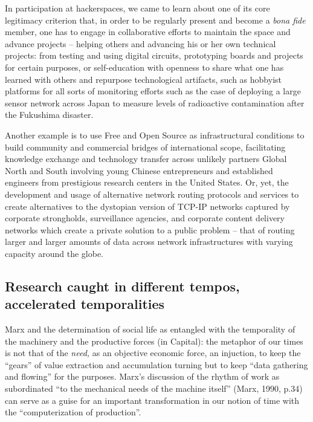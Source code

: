 \documentclass[10pt,letter,oneside]{scrartcl}
\begin{document}
  In participation at hackerspaces, we came to learn about one of its
  core legitimacy criterion that, in order to be regularly present and
  become a \emph{bona fide} member, one has to engage in collaborative
  efforts to maintain the space and advance projects -- helping others
  and advancing his or her own technical projects: from testing and
  using digital circuits, prototyping boards and projects for certain
  purposes, or self-education with openness to share what one has
  learned with others and repurpose technological artifacts, such as
  hobbyist platforms for all sorts of monitoring efforts such as the
  case of deploying a large sensor network across Japan to measure
  levels of radioactive contamination after the Fukushima
  disaster.

  Another example is to use Free and Open Source as infrastructural
  conditions to build community and commercial bridges of
  international scope, facilitating knowledge exchange and technology
  transfer across unlikely partners Global North and South involving
  young Chinese entrepreneurs and established engineers from
  prestigious research centers in the United States. Or, yet, the
  development and usage of alternative network routing protocols and
  services to create alternatives to the dystopian version of TCP-IP
  networks captured by corporate strongholds, surveillance agencies,
  and corporate content delivery networks which create a private
  solution to a public problem -- that of routing larger and larger
  amounts of data across network infrastructures with varying capacity
  around the globe.

\subsection{Research caught in different tempos, accelerated
    temporalities} 

  Marx and the determination of social life as entangled with the
  temporality of the machinery and the productive forces (in Capital):
  the metaphor of our times is not that of the \emph{need,} as an
  objective economic force, an injuction, to keep the ``gears'' of
  value extraction and accumulation turning but to keep ``data
  gathering and flowing'' for the purposes. Marx's discussion of the
  rhythm of work as subordinated ``to the mechanical needs of the
  machine itself'' (Marx, 1990, p.34) can serve as a guise for an
  important transformation in our notion of time with the
  ``computerization of production''. 
\end{document}
